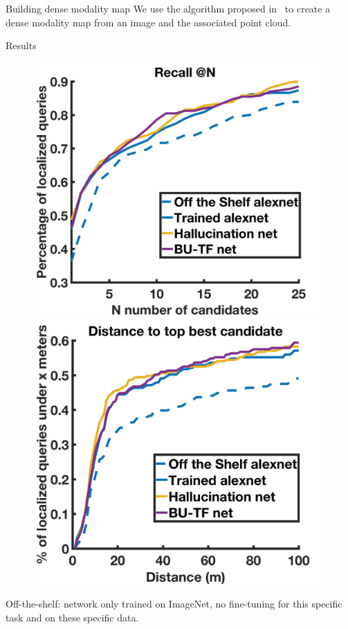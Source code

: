 \begin{frame}{Building dense modality map}
	We use the algorithm proposed in~\cite{Bevilacqua2017} to create a dense modality map from an image and the associated point cloud.
\end{frame}

\begin{frame}{Results}
	\begin{figure}[t]
		\centering
		\includegraphics[width=0.499\linewidth]{images/global_res/recall.jpg}\hfill
		\includegraphics[width=0.499\linewidth]{images/global_res/dist.jpg}			
	\end{figure}	
	Off-the-shelf: network only trained on ImageNet, no fine-tuning for this specific task and on these specific data.
\end{frame}

